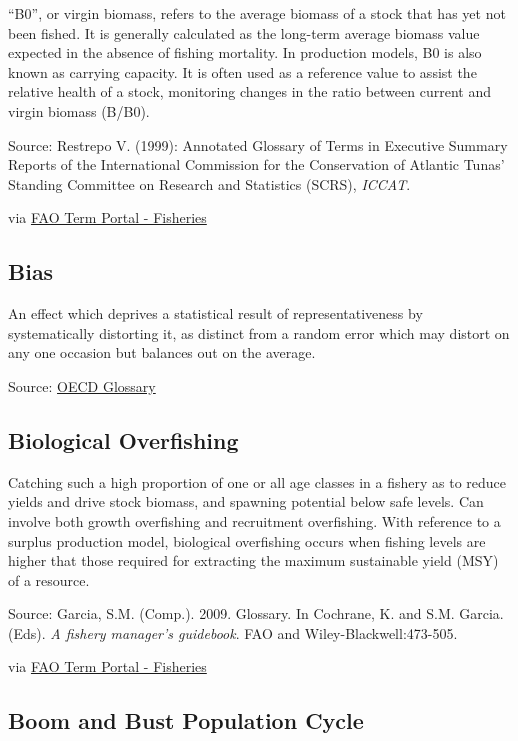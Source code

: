 \documentclass[
  11pt,
]{book}
\begin{document}
``B0'', or virgin biomass, refers to the average biomass of a stock that has yet not been fished. It is generally calculated as the long-term average biomass value expected in the absence of fishing mortality. In production models, B0 is also known as carrying capacity. It is often used as a reference value to assist the relative health of a stock, monitoring changes in the ratio between current and virgin biomass (B/B0).

Source: Restrepo V. (1999): Annotated Glossary of Terms in Executive Summary Reports of the International Commission for the Conservation of Atlantic Tunas' Standing Committee on Research and Statistics (SCRS), \emph{ICCAT}.

via \href{http://www.fao.org/fishery/glossary/en}{FAO Term Portal - Fisheries}

\hypertarget{bias}{%
\subsection{Bias}\label{bias}}

An effect which deprives a statistical result of representativeness by systematically distorting it, as distinct from a random error which may distort on any one occasion but balances out on the average.

Source: \href{https://stats.oecd.org/glossary/detail.asp?ID=3605}{OECD Glossary}

\hypertarget{biological-overfishing}{%
\subsection{Biological Overfishing}\label{biological-overfishing}}

Catching such a high proportion of one or all age classes in a fishery as to reduce yields and drive stock biomass, and spawning potential below safe levels. Can involve both growth overfishing and recruitment overfishing. With reference to a surplus production model, biological overfishing occurs when fishing levels are higher that those required for extracting the maximum sustainable yield (MSY) of a resource.

Source: Garcia, S.M. (Comp.). 2009. Glossary. In Cochrane, K. and S.M. Garcia. (Eds). \emph{A fishery manager's guidebook}. FAO and Wiley-Blackwell:473-505.

via \href{http://www.fao.org/fishery/glossary/en}{FAO Term Portal - Fisheries}

\hypertarget{boom-and-bust-population-cycle}{%
\subsection{Boom and Bust Population Cycle}\label{boom-and-bust-population-cycle}}
\end{document}
